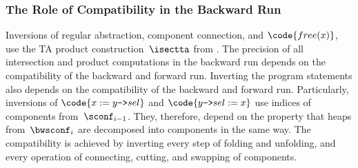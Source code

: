 \begin{itemize}
\end{itemize}

\subsubsection*{The Role of Compatibility in the Backward Run}\label{sec:label}

Inversions of regular abstraction, component connection, and $\code{free(x)}$,
use the TA product construction~$\isectta$ from .
%
The precision of all intersection and product computations in the backward run
depends on the compatibility of the backward and forward run.
%
Inverting the program statements also depends on the compatibility of the backward and forward run. 
Particularly, inversions of $\code{x := y\text{\texttt{->}}sel}$ and
$\code{y\text{\texttt{->}}sel := x}$ use indices of components from~$\sconf_{i-1}$.
They, therefore,
depend on the property that heaps from~$\bwsconf_{i}$ are decomposed into components in the same way.
%
%
The compatibility is achieved by inverting every step of folding and unfolding,
and every operation of connecting, cutting, and swapping of components.


